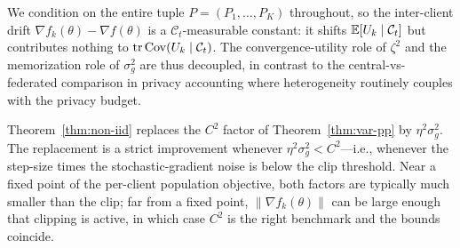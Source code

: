 \begin{remark}\label{rem:het-invisible}
We condition on the entire tuple \(P=(P_1,\dots,P_K)\) throughout, so the inter-client drift \(\nabla f_k(\theta)-\nabla f(\theta)\) is a \(\mathcal C_t\)-measurable constant: it shifts \(\mathbb{E}[U_k\mid\mathcal C_t]\) but contributes nothing to \(\operatorname{tr}\operatorname{Cov}(U_k\mid\mathcal C_t)\). The convergence-utility role of \(\zeta^2\) and the memorization role of \(\sigma_g^2\) are thus decoupled, in contrast to the central-vs-federated comparison in privacy accounting where heterogeneity routinely couples with the privacy budget.
\end{remark}

\begin{remark}\label{rem:noniid-vs-clip}
Theorem~\ref{thm:non-iid} replaces the \(C^2\) factor of Theorem~\ref{thm:var-pp} by \(\eta^2\sigma_g^2\). The replacement is a strict improvement whenever \(\eta^2\sigma_g^2 < C^2\)---i.e., whenever the step-size times the stochastic-gradient noise is below the clip threshold. Near a fixed point of the per-client population objective, both factors are typically much smaller than the clip; far from a fixed point, \(\|\nabla f_k(\theta)\|\) can be large enough that clipping is active, in which case \(C^2\) is the right benchmark and the bounds coincide.
\end{remark}
